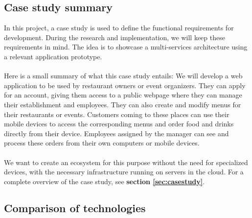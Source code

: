 \documentclass[12pt]{article}
\begin{document}
\begin{multicols}{2}
\subsection{Case study summary}
In this project, a case study is used to define the functional requirements for development. During the research and implementation, we will keep these requirements in mind. The idea is to showcase a multi-services architecture using a relevant application prototype. 
\\\\
Here is a small summary of what this case study entails: We will develop a web application to be used by restaurant owners or event organizers. They can apply for an account, giving them access to a public webpage where they can manage their establishment and employees. They can also create and modify menus for their restaurants or events. Customers coming to these places can use their mobile devices to access the corresponding menus and order food and drinks directly from their device. Employees assigned by the manager can see and process these orders from their own computers or mobile devices. 
\\\\
We want to create an ecosystem for this purpose without the need for specialized devices, with the necessary infrastructure running on servers in the cloud. For a complete overview of the case study, see \textbf{section \ref{sec:casestudy}}.



\subsection{Comparison of technologies}\label{sec:comparison}


\end{multicols}
\end{document}
